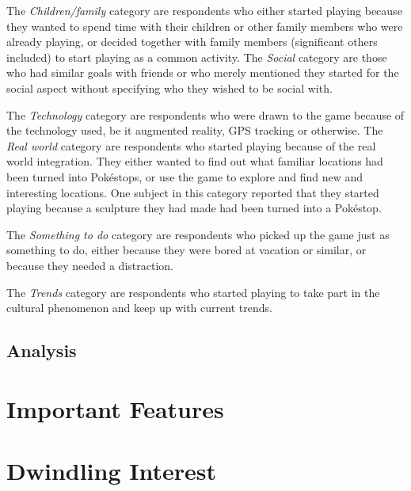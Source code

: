 The \emph{Children/family} category are respondents who either started playing because they wanted to spend time with their children or other family members who were already playing, or decided together with family members (significant others included) to start playing as a common activity. The \emph{Social} category are those who had similar goals with friends or who merely mentioned they started for the social aspect without specifying who they wished to be social with.

The \emph{Technology} category are respondents who were drawn to the game because of the technology used, be it augmented reality, GPS tracking or otherwise. The \emph{Real world} category are respondents who started playing because of the real world integration. They either wanted to find out what familiar locations had been turned into Pokéstops, or use the game to explore and find new and interesting locations. One subject in this category reported that they started playing because a sculpture they had made had been turned into a Pokéstop.

The \emph{Something to do} category are respondents who picked up the game just as something to do, either because they were bored at vacation or similar, or because they needed a distraction.

The \emph{Trends} category are respondents who started playing to take part in the cultural phenomenon and keep up with current trends.


\subsection{Analysis}


\section{Important Features}


\section{Dwindling Interest}

